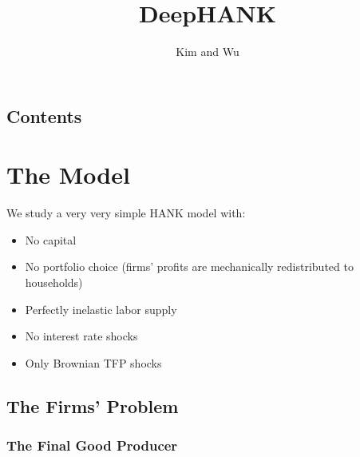 \documentclass[notitlepage,a4paper,11pt]{report}
\makeatletter
\let\reportmaketitle=\maketitle
\renewcommand{\maketitle}{\begingroup\let\footnote=\thanks \reportmaketitle\endgroup}
\numberwithin{section}{chapter}
\numberwithin{subsection}{section}
\def\tableofcontents{\section*{Contents}\@starttoc{toc}}
\makeatother
\begin{document}
\pagestyle{fancy}
\fancyhf{}
\onehalfspacing


\title{\huge DeepHANK}
\author{Kim and Wu}

\maketitle

\tableofcontents



\chapter{The Model}

We study a very very simple HANK model with: 
\begin{itemize}
\item No capital

\item No portfolio choice (firms' profits are mechanically redistributed to households) 

\item Perfectly inelastic labor supply

\item No interest rate shocks

\item Only Brownian TFP shocks
\end{itemize}



\vspace{1cm}

\section{The Firms' Problem}

\subsection{The Final Good Producer}
\end{document}

